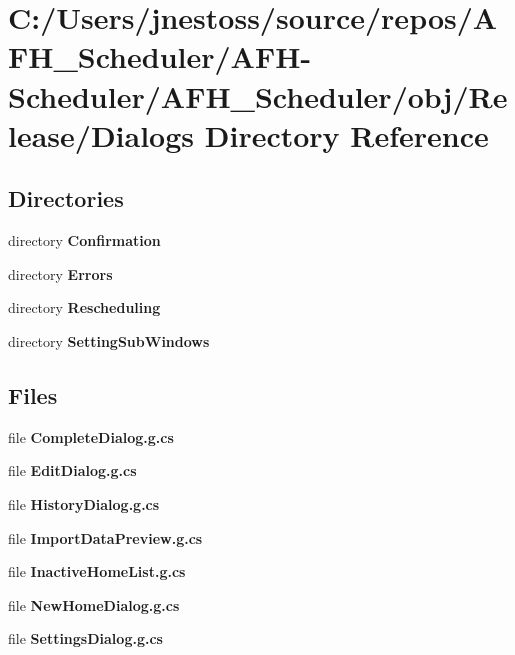 \section{C\+:/\+Users/jnestoss/source/repos/\+A\+F\+H\+\_\+\+Scheduler/\+A\+F\+H-\/\+Scheduler/\+A\+F\+H\+\_\+\+Scheduler/obj/\+Release/\+Dialogs Directory Reference}
\label{dir_996c8f8bbecb1208c0ed0367bd259ff7}
\subsection*{Directories}
\begin{DoxyCompactItemize}
\item 
directory \textbf{ Confirmation}
\item 
directory \textbf{ Errors}
\item 
directory \textbf{ Rescheduling}
\item 
directory \textbf{ Setting\+Sub\+Windows}
\end{DoxyCompactItemize}
\subsection*{Files}
\begin{DoxyCompactItemize}
\item 
file \textbf{ Complete\+Dialog.\+g.\+cs}
\item 
file \textbf{ Edit\+Dialog.\+g.\+cs}
\item 
file \textbf{ History\+Dialog.\+g.\+cs}
\item 
file \textbf{ Import\+Data\+Preview.\+g.\+cs}
\item 
file \textbf{ Inactive\+Home\+List.\+g.\+cs}
\item 
file \textbf{ New\+Home\+Dialog.\+g.\+cs}
\item 
file \textbf{ Settings\+Dialog.\+g.\+cs}
\end{DoxyCompactItemize}
